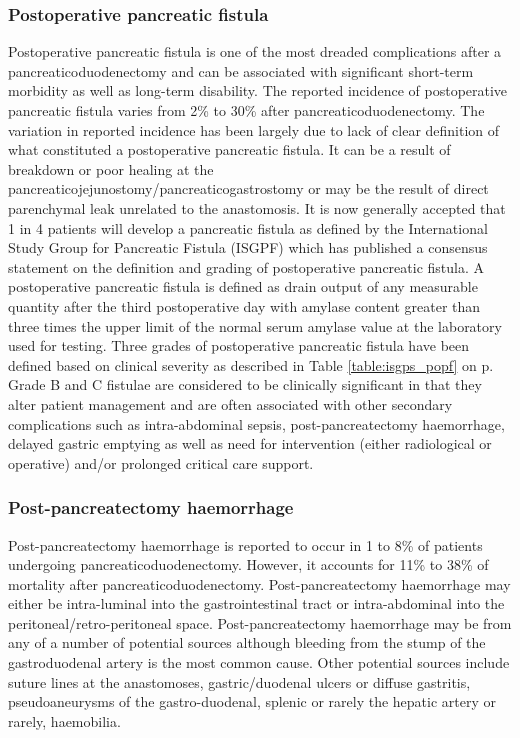 \subsubsection{Postoperative pancreatic fistula}
Postoperative pancreatic fistula is one of the most dreaded complications after a pancreaticoduodenectomy and can be associated with significant short-term morbidity as well as long-term disability. The reported incidence of postoperative pancreatic fistula varies from 2\% to 30\% after pancreaticoduodenectomy.\parencite{yeo_six_1997,deoliveira_assessment_2006,bassi_postoperative_2005,winter_biochemical_2007,pratt_risk_2008} 
The variation in reported incidence has been largely due to lack of clear definition of what constituted a postoperative pancreatic fistula. It can be a result of breakdown or poor healing at the pancreaticojejunostomy/pancreaticogastrostomy or may be the result of direct parenchymal leak unrelated to the anastomosis. It is now generally accepted that 1 in 4 patients will develop a pancreatic fistula as defined by the International Study Group for Pancreatic Fistula (ISGPF) which has published a consensus statement on the definition and grading of postoperative pancreatic fistula.\parencite{bassi_postoperative_2005} A postoperative pancreatic fistula is defined as drain output of any measurable quantity after the third postoperative day with amylase content greater than three times the upper limit of the normal serum amylase value at the laboratory used for testing. Three grades of postoperative pancreatic fistula have been defined based on clinical severity as described in Table \ref{table:isgps_popf} on p\pageref{table:isgps_popf}. Grade B and C fistulae are considered to be clinically significant in that they alter patient management and are often associated with other secondary complications such as intra-abdominal sepsis, post-pancreatectomy haemorrhage, delayed gastric emptying as well as need for intervention (either radiological or operative) and/or prolonged critical care support.

\subsubsection{Post-pancreatectomy haemorrhage}
Post-pancreatectomy haemorrhage is reported to occur in 1 to 8\% of patients undergoing pancreaticoduodenectomy. However, it accounts for 11\% to 38\% of mortality after pancreaticoduodenectomy. Post-pancreatectomy haemorrhage may either be intra-luminal into the gastrointestinal tract or intra-abdominal into the peritoneal/retro-peritoneal space. Post-pancreatectomy haemorrhage may be from any of a number of potential sources although bleeding from the stump of the gastroduodenal artery is the most common cause. Other potential sources include suture lines at the anastomoses, gastric/duodenal ulcers or diffuse gastritis, pseudoaneurysms of the gastro-duodenal, splenic or rarely the hepatic artery or rarely, haemobilia.


